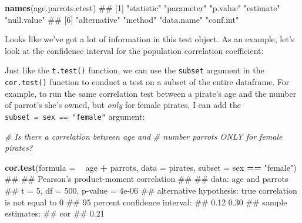 \documentclass[]{book}
\newenvironment{Shaded}{\begin{snugshade}}{\end{snugshade}}
\newcommand{\KeywordTok}[1]{\textcolor[rgb]{0.13,0.29,0.53}{\textbf{#1}}}
\newcommand{\DataTypeTok}[1]{\textcolor[rgb]{0.13,0.29,0.53}{#1}}
\newcommand{\StringTok}[1]{\textcolor[rgb]{0.31,0.60,0.02}{#1}}
\newcommand{\CommentTok}[1]{\textcolor[rgb]{0.56,0.35,0.01}{\textit{#1}}}
\newcommand{\OperatorTok}[1]{\textcolor[rgb]{0.81,0.36,0.00}{\textbf{#1}}}
\newcommand{\NormalTok}[1]{#1}
\theoremstyle{definition}
\theoremstyle{definition}
\theoremstyle{remark}
\begin{document}
\begin{Shaded}
\begin{Highlighting}[]
\KeywordTok{names}\NormalTok{(age.parrots.ctest)}
\NormalTok{## [1] "statistic"   "parameter"   "p.value"     "estimate"    "null.value" }
\NormalTok{## [6] "alternative" "method"      "data.name"   "conf.int"}
\end{Highlighting}
\end{Shaded}

Looks like we've got a lot of information in this test object. As an
example, let's look at the confidence interval for the population
correlation coefficient:

\begin{Shaded}
\end{Shaded}

Just like the \texttt{t.test()} function, we can use the \texttt{subset}
argument in the \texttt{cor.test()} function to conduct a test on a
subset of the entire dataframe. For example, to run the same correlation
test between a pirate's age and the number of parrot's she's owned, but
\emph{only} for female pirates, I can add the
\texttt{subset\ =\ sex\ ==\ "female"} argument:

\begin{Shaded}
\begin{Highlighting}[]
\CommentTok{# Is there a correlation between age and }
\CommentTok{#  number parrots ONLY for female pirates?}

\KeywordTok{cor.test}\NormalTok{(}\DataTypeTok{formula =} \OperatorTok{~}\StringTok{ }\NormalTok{age }\OperatorTok{+}\StringTok{ }\NormalTok{parrots,}
         \DataTypeTok{data =}\NormalTok{ pirates,}
         \DataTypeTok{subset =}\NormalTok{ sex }\OperatorTok{==}\StringTok{ "female"}\NormalTok{)}
\NormalTok{## }
\NormalTok{##  Pearson's product-moment correlation}
\NormalTok{## }
\NormalTok{## data:  age and parrots}
\NormalTok{## t = 5, df = 500, p-value = 4e-06}
\NormalTok{## alternative hypothesis: true correlation is not equal to 0}
\NormalTok{## 95 percent confidence interval:}
\NormalTok{##  0.12 0.30}
\NormalTok{## sample estimates:}
\NormalTok{##  cor }
\NormalTok{## 0.21}
\end{Highlighting}
\end{Shaded}
\end{document}
